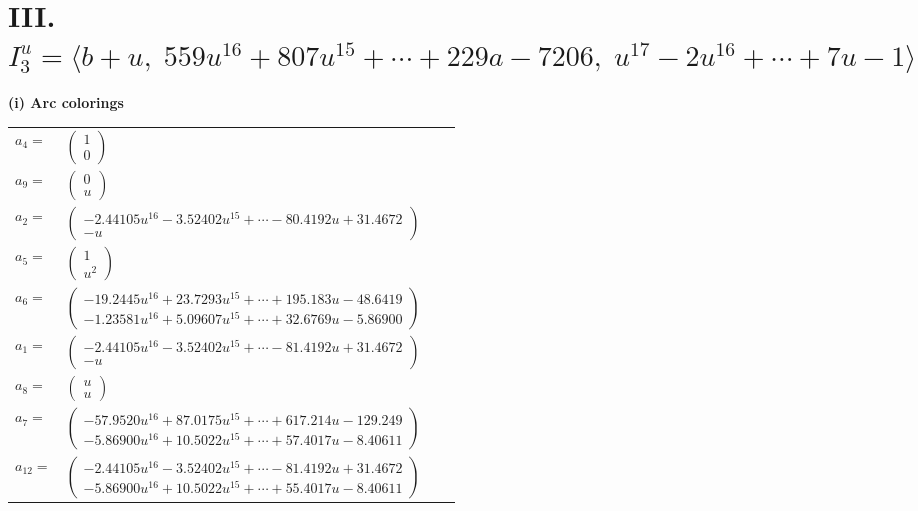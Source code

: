 \documentclass[1p]{elsarticle_modified}
\theoremstyle{definition}
\begin{document}
\centering \section*{III. $I^u_{3}= \langle b+u,\;559 u^{16}+807 u^{15}+\cdots+229 a-7206,\;u^{17}-2 u^{16}+\cdots+7 u-1 \rangle$}
\flushleft \textbf{(i) Arc colorings}\\
\begin{tabular}{m{7pt} m{180pt} m{7pt} m{180pt} }
\flushright $a_{4}=$&$\begin{pmatrix}1\\0\end{pmatrix}$ \\
\flushright $a_{9}=$&$\begin{pmatrix}0\\u\end{pmatrix}$ \\
\flushright $a_{2}=$&$\begin{pmatrix}-2.44105 u^{16}-3.52402 u^{15}+\cdots-80.4192 u+31.4672\\- u\end{pmatrix}$ \\
\flushright $a_{5}=$&$\begin{pmatrix}1\\u^2\end{pmatrix}$ \\
\flushright $a_{6}=$&$\begin{pmatrix}-19.2445 u^{16}+23.7293 u^{15}+\cdots+195.183 u-48.6419\\-1.23581 u^{16}+5.09607 u^{15}+\cdots+32.6769 u-5.86900\end{pmatrix}$ \\
\flushright $a_{1}=$&$\begin{pmatrix}-2.44105 u^{16}-3.52402 u^{15}+\cdots-81.4192 u+31.4672\\- u\end{pmatrix}$ \\
\flushright $a_{8}=$&$\begin{pmatrix}u\\u\end{pmatrix}$ \\
\flushright $a_{7}=$&$\begin{pmatrix}-57.9520 u^{16}+87.0175 u^{15}+\cdots+617.214 u-129.249\\-5.86900 u^{16}+10.5022 u^{15}+\cdots+57.4017 u-8.40611\end{pmatrix}$ \\
\flushright $a_{12}=$&$\begin{pmatrix}-2.44105 u^{16}-3.52402 u^{15}+\cdots-81.4192 u+31.4672\\-5.86900 u^{16}+10.5022 u^{15}+\cdots+55.4017 u-8.40611\end{pmatrix}$ \\

\end{tabular}
\end{document}
